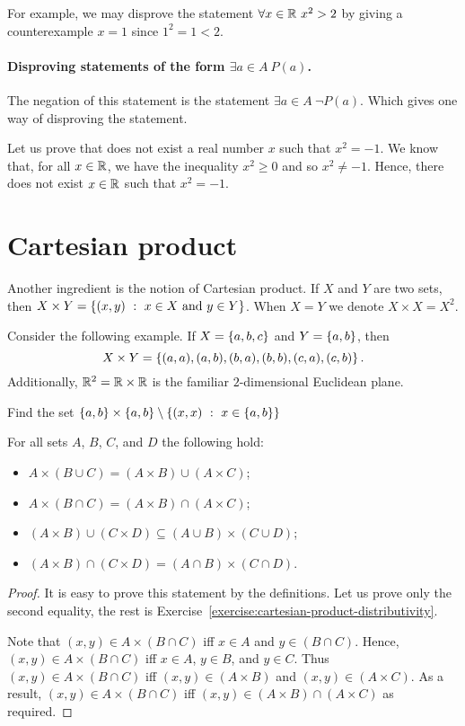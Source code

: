 For example, we may disprove the statement $\forall x \in \mathbb{R} \ x^2 > 2$ by
giving a counterexample $x = 1$ since $1^2 = 1 < 2$.

\paragraph{Disproving statements of the form $\exists a \in A \ P(a)$.}
The negation of this statement is the statement $\exists a \in A \ \lnot P(a)$.
Which gives one way of disproving the statement.

Let us prove that does not exist a real number $x$ such that $x^2 = -1$. We
know that, for all $x \in \mathbb{R}$, we have the inequality $x^2 \ge 0$ and so $x^2
\neq -1$. Hence, there does not exist $x \in \mathbb{R}$ such that $x^2 = -1$.

\section{Cartesian product}
Another ingredient is the notion of Cartesian product. If $X$ and $Y$ are two
sets, then $X \times Y = \set[x \in X \text{ and } y \in Y]{(x, y)}$. When $X =
Y$ we denote $X \times X = X^2$.

Consider the following example. If $X = \set{a, b, c}$ and $Y = \set{a, b}$,
then $$X \times Y = \set{(a, a), (a, b), (b, a), (b, b), (c, a), (c, b)}.$$
Additionally, $\mathbb{R}^2 = \mathbb{R} \times \mathbb{R}$ is the familiar $2$-dimensional Euclidean
plane.

\begin{exercise}
  Find the set $\set{a, b} \times \set{a, b} \setminus
  \set[x \in \set{a, b}]{(x, x)}$
\end{exercise}

\begin{theorem}
\label{theorem:cartesian-product-distributivity}
  For all sets $A$, $B$, $C$, and $D$ the following hold:
  \begin{itemize}
    \item $A \times (B \cup C) = (A \times B) \cup (A \times C)$;
    \item $A \times (B \cap C) = (A \times B) \cap (A \times C)$;
    \item $(A \times B) \cup (C \times D) \subseteq
      (A \cup B) \times (C \cup D)$;
    \item $(A \times B) \cap (C \times D) =
      (A \cap B) \times (C \cap D)$.
  \end{itemize}
\end{theorem}
\begin{proof}
  It is easy to prove this statement by the definitions. Let us prove only the
  second equality, the rest is
  Exercise~\ref{exercise:cartesian-product-distributivity}.

  Note that $(x, y) \in A \times (B \cap C)$ iff $x \in A$ and
  $y \in (B \cap C)$.
  Hence, $(x, y) \in A \times (B \cap C)$ iff $x \in A$, $y \in B$, and
  $y \in C$. Thus $(x, y) \in A \times (B \cap C)$ iff
  $(x, y) \in (A \times B)$ and $(x, y) \in (A \times C)$. As a result,
  $(x, y) \in A \times (B \cap C)$ iff
  $(x, y) \in (A \times B) \cap (A \times C)$ as required.
\end{proof}


